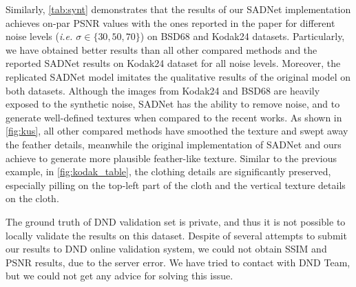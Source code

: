 Similarly, \autoref{tab:synt} demonstrates that the results of our SADNet implementation achieves on-par PSNR values with the ones reported in the paper for different noise levels (\textit{i.e. $\sigma\in\{30, 50, 70\}$}) on BSD68 and Kodak24 datasets. Particularly, we have obtained better results than all other compared methods and the reported SADNet results on Kodak24 dataset for all noise levels. Moreover, the replicated SADNet model imitates the qualitative results of the original model on both datasets. Although the images from Kodak24 and BSD68 are heavily exposed to the synthetic noise, SADNet has the ability to remove noise, and to generate well-defined textures when compared to the recent works. As shown in \autoref{fig:kus}, all other compared methods have smoothed the texture and swept away the feather details, meanwhile the original implementation of SADNet and ours achieve to generate more plausible feather-like texture. Similar to the previous example, in \autoref{fig:kodak_table}, the clothing details are significantly preserved, especially pilling on the top-left part of the cloth and the vertical texture details on the cloth.   

The ground truth of DND validation set is private, and thus it is not possible to locally validate the results on this dataset. Despite of several attempts to submit our results to DND online validation system, we could not obtain SSIM and PSNR results, due to the server error. We have tried to contact with DND Team, but we could not get any advice for solving this issue.


